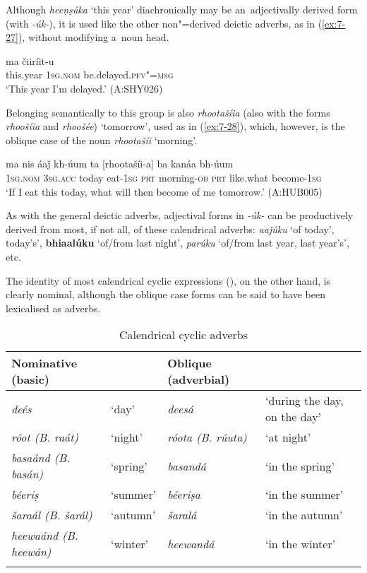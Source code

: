 Although \textit{heeṇṣúka} `this year' diachronically may be an~adjectivally derived form (with \textit{-úk-}), it is used like the other non"=derived deictic adverbs, as in (\ref{ex:7-27}), without modifying a~noun head. 

\begin{exe}
\ex
\label{ex:7-27}
\gll [heeṇṣúka] ma čiiríit-u \\
this.year  \textsc{1sg.nom}  be.delayed.\textsc{pfv"=msg} \\
\glt `This year I'm delayed.' (A:SHY026)
\end{exe}

Belonging semantically to this group is also \textit{rhootašíia} (also with the forms \textit{rhoošíia} and \textit{rhoošée}) `tomorrow', used as in (\ref{ex:7-28}), which, however, is the oblique case of the noun \textit{rhootašíi} `morning'.

\begin{exe}
\ex
\label{ex:7-28}
\gll ma nis áaǰ kh-úum ta [rhootašíi-a] ba  kanáa bh-úum \\
\textsc{1sg.nom} \textsc{3sg.acc} today eat-\textsc{1sg} \textsc{prt} morning-\textsc{ob} \textsc{prt} like.what become-\textsc{1sg} \\
\glt `If I eat this today, what will then become of me tomorrow.' (A:HUB005)
\end{exe}

As with the general deictic adverbs, adjectival forms in \textit{-úk-} can be productively derived from most, if not all, of these calendrical adverbs: \textit{aaǰúku} `of today', today's', \textbf{bhiaalúku} `of/from last night', \textit{parúku} `of/from last year, last year's', etc. 


The identity of most calendrical cyclic expressions (), on the other hand, is clearly nominal, although the oblique case forms can be said to have been lexicalised as adverbs. 


\begin{table}[ht]
\caption{Calendrical cyclic adverbs}
\begin{tabularx}{\textwidth}{ Q l l Q }
\lsptoprule
Nominative (basic) &
&
Oblique (adverbial) &
\\\hline
\textit{deés} &
`day' &
\textit{deesá} &
`during the day, on the day'\\
\textit{róot (B. raát)} &
`night' &
\textit{róota (B.} \textit{rúuta)} &
`at night'\\
\textit{basaánd (B. basán)} &
`spring' &
\textit{basandá} &
`in the spring'\\
\textit{béeriṣ} &
`summer' &
\textit{béeriṣa} &
`in the summer'\\
\textit{šaraál (B. šarál)} &
`autumn' &
\textit{šaralá} &
`in the autumn'\\
\textit{heewaánd (B.} \textit{heewán)} &
`winter' &
\textit{heewandá} &
`in the winter'\\\lspbottomrule
\end{tabularx}
\label{tab:7-2}
\end{table}


